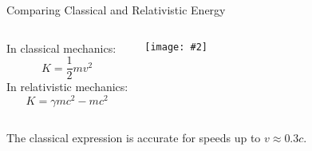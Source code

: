 \documentclass[12pt,compress,aspectratio=169]{beamer}
\newcommand{\pic}[2]{\texttt{[image: \#2]}}
\begin{document}
\begin{frame}{Comparing Classical and Relativistic Energy}
  \begin{columns}
    In classical mechanics:
    {\Large
      \begin{displaymath}
        K=\frac12mv^2
      \end{displaymath}
    }
    In relativistic mechanics:
    {\Large
      \begin{displaymath}
        K=\gamma mc^2-mc^2
      \end{displaymath}
    }
    
    \pic{.85}{graphics/e_k}
  \end{columns}

  The classical expression is accurate for speeds up to $v\approx 0.3c$.
\end{frame}



\end{document}
